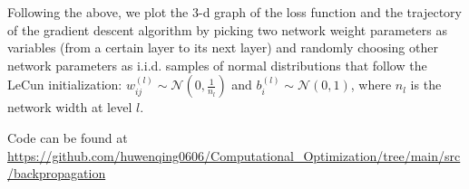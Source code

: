 Following the above, we plot the 3-d graph of the loss function and the trajectory of the gradient descent algorithm by picking two network weight parameters as variables (from a certain layer to its next layer) and randomly choosing other network parameters as i.i.d. samples of normal distributions that follow the LeCun initialization: $w_{ij}^{(l)}\sim \mathcal{N}(0, \frac{1}{n_l})$ and $b_i^{(l)}\sim \mathcal{N}(0, 1)$, where $n_l$ is the network width at level $l$.

Code can be found at \url{https://github.com/huwenqing0606/Computational_Optimization/tree/main/src/backpropagation}
